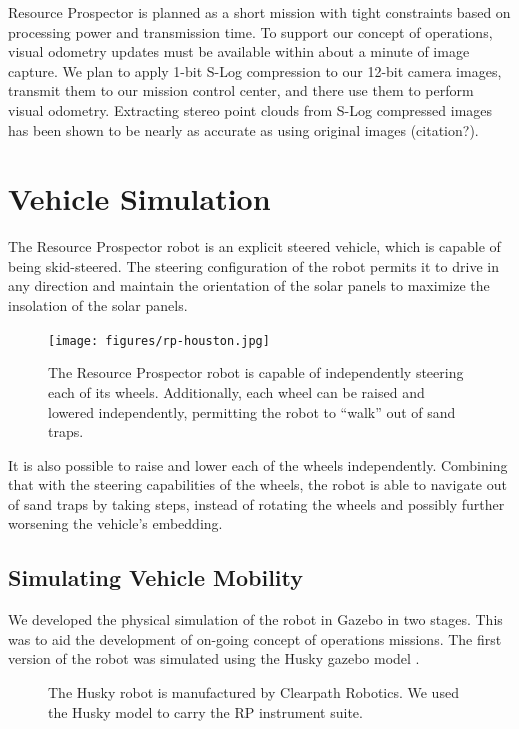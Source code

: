 \documentclass[twocolumn,letterpaper]{IEEEAerospaceCLS}  %
\begin{document}
Resource Prospector is planned as a short mission with tight constraints based on processing power and transmission time. To support our concept of operations, visual odometry updates must be available within about a minute of image capture. We plan to apply 1-bit S-Log compression to our 12-bit camera images, transmit them to our mission control center, and there use them to perform visual odometry. Extracting stereo point clouds from S-Log compressed images has been shown to be nearly as accurate as using original images (citation?).

\section{Vehicle Simulation}

The Resource Prospector robot is an explicit steered vehicle, which is capable of being skid-steered. The steering configuration of the robot permits it to drive in any direction and maintain the orientation of the solar panels to maximize the insolation of the solar panels.  

\begin{figure}[htp!]
\centering
\texttt{[image: figures/rp-houston.jpg]}
\caption{The Resource Prospector robot is capable of independently steering each of its wheels.  Additionally, each wheel can be raised and lowered independently, permitting the robot to ``walk'' out of sand traps.  \label{fig:rp-houston}}
\end{figure}

It is also possible to raise and lower each of the wheels independently. Combining that with the steering capabilities of the wheels, the robot is able to navigate out of sand traps by taking steps, instead of rotating the wheels and possibly further worsening the vehicle's embedding.

\subsection{Simulating Vehicle Mobility}
\label{sec:simulated-rover}

We developed the physical simulation of the robot in Gazebo in two stages. This was to aid the development of on-going concept of operations missions.  The first version of the robot was simulated using the Husky gazebo model \cite{gariepy2015husky}.  

\begin{figure}[htp]
\caption{The Husky robot is manufactured by Clearpath Robotics.  We used the Husky model to carry the RP instrument suite. \label{fig:husky}}
\end{figure}
\end{document}
